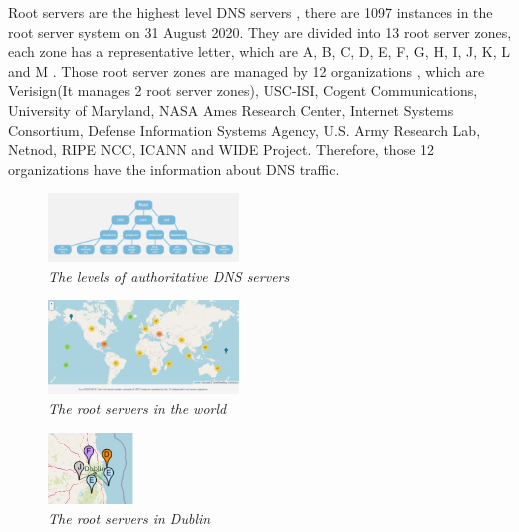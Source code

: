 \documentclass[conference]{IEEEtran}
\begin{document}
Root servers are the highest level DNS servers \cite{dns_root_server_cloudflare}, there are 1097 instances in the root server system on 31 August 2020. They are divided into 13 root server zones, each zone has a representative letter, which are A, B, C, D, E, F, G, H, I, J, K, L and M \cite{root_server_wiki}. Those root server zones are managed by 12 organizations \cite{root_servers_org}, which are Verisign(It manages 2 root server zones), USC-ISI, Cogent Communications, University of Maryland, NASA Ames Research Center, Internet Systems Consortium, Defense Information Systems Agency, U.S. Army Research Lab, Netnod, RIPE NCC, ICANN and WIDE Project. Therefore, those 12 organizations have the information about DNS traffic.
\\

\begin{figure}[hbt!]  
    \centering
    \includegraphics[width=0.45\textwidth]{figure/dns-root-server.png}
    \caption{\em The levels of authoritative DNS servers \cite{dns_root_server_cloudflare} \label{fig:levels_authoritative_DNS_servers}}
    \label{tab:Authoritative_DNS_server_levels}
\end{figure}

\begin{figure}[hbt!]  
    \centering
    \includegraphics[width=0.45\textwidth]{figure/root-server-map-big.jpg}
    \caption{\em The root servers in the world \cite{root_servers_org} \label{fig:root_servers_in_the_world}}
\end{figure}

\begin{figure}[hbt!]  
    \centering
    \includegraphics[width=0.20\textwidth]{figure/root-server-map-dublin.jpg}
    \caption{\em The root servers in Dublin \cite{root_servers_org} \label{fig:root_servers_dublin}}
\end{figure}
\end{document}
